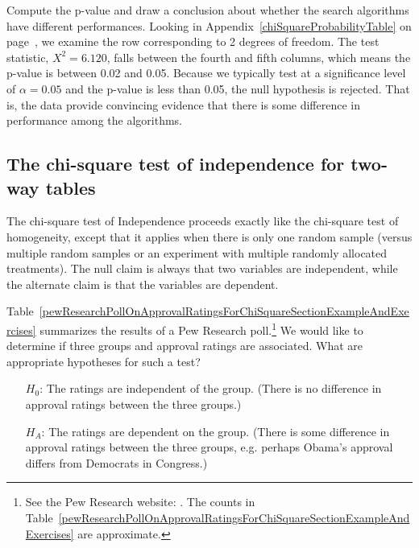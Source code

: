 \begin{example}{Compute the p-value and draw a conclusion about whether the search algorithms have different performances.}
Looking in Appendix~\ref{chiSquareProbabilityTable} on page~\pageref{chiSquareProbabilityTable}, we examine the row corresponding to 2 degrees of freedom. The test statistic, $X^2=6.120$, falls between the fourth and fifth columns, which means the p-value is between 0.02 and 0.05. Because we typically test at a significance level of $\alpha=0.05$ and the p-value is less than 0.05, the null hypothesis is rejected. That is, the data provide convincing evidence that there is some difference in performance among the algorithms.
\end{example}



\subsection{The chi-square test of independence for two-way tables}

The chi-square test of Independence proceeds exactly like the chi-square test of homogeneity, except that it applies when there is only one random sample (versus multiple random samples or an experiment with multiple randomly allocated treatments). The null claim is always that two variables are independent, while the alternate claim is that the variables are dependent.

\begin{example}{Table~\ref{pewResearchPollOnApprovalRatingsForChiSquareSectionExampleAndExercises} summarizes the results of a Pew Research poll.\footnote{See the Pew Research website: {\scriptsize{}}. The counts in Table~\ref{pewResearchPollOnApprovalRatingsForChiSquareSectionExampleAndExercises} are approximate.} We would like to determine if three groups and approval ratings are associated. What are appropriate hypotheses for such a test?}\label{hypothesisTestSetupForPewResearchPollOnApprovalRatingsForChiSquareSection}
\begin{itemize}
\item[$H_0$:] The ratings are independent of the group. (There is no difference in approval ratings between the three groups.)
\item[$H_A$:] The ratings are dependent on the group. (There is some difference in approval ratings between the three groups, e.g. perhaps Obama's approval differs from Democrats in Congress.)
\end{itemize}
\end{example}

